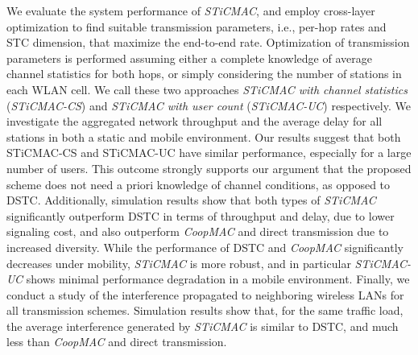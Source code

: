 \documentclass[peerreview,draftcls,onecolumn,12pt,a4paper]{IEEEtran}
\begin{document}
We evaluate the system performance of \emph{STiCMAC}, and employ
cross-layer optimization to find suitable transmission parameters,
i.e., per-hop rates and STC dimension, that maximize the
end-to-end rate.  Optimization of transmission parameters is
performed assuming either a complete knowledge of average channel
statistics for both hops, or simply considering the number of
stations in each WLAN cell. We call these two approaches
\emph{STiCMAC with channel statistics} (\emph{STiCMAC-CS}) and
\emph{STiCMAC with user count} (\emph{STiCMAC-UC}) respectively.
We investigate the aggregated network throughput and the average
delay for all stations in both a static and mobile environment.
Our results suggest that both STiCMAC-CS and STiCMAC-UC have
similar performance, especially for a large number of users. This
outcome strongly supports our argument that the proposed scheme
does not need a priori knowledge of channel conditions, as opposed
to DSTC. Additionally, simulation results show that
both types of \emph{STiCMAC} significantly outperform DSTC in
terms of throughput and delay, due to lower signaling cost, and
also outperform \emph{CoopMAC} and direct transmission due to
increased diversity. While the performance of DSTC and
\emph{CoopMAC} significantly decreases under mobility,
\emph{STiCMAC} is more robust, and in particular \emph{STiCMAC-UC}
shows minimal performance degradation in a mobile environment.
Finally, we conduct a study
of the interference propagated to neighboring wireless LANs for
all transmission schemes. Simulation results show that, for the
same traffic load, the average interference generated by
\emph{STiCMAC} is similar to DSTC, and much less than
\emph{CoopMAC} and direct transmission.
\end{document}
